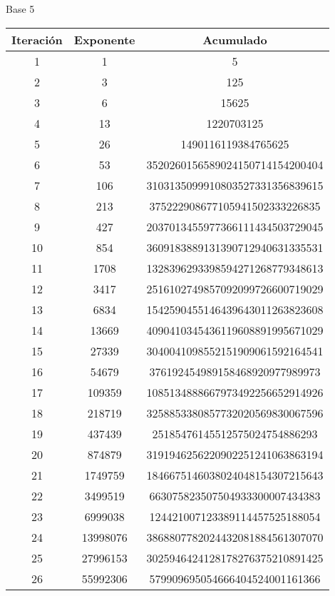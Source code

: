 \documentclass[fleqn]{article}
\begin{document}
\begin{center}
        \newpage Base 5
        \begin{tabular}{c | c | c}
            Iteración & Exponente & Acumulado \\ \hline
            1 & 1 & 5 \\
            2 & 3 & 125 \\
            3 & 6 & 15625 \\
            4 & 13 & 1220703125 \\
            5 & 26 & 1490116119384765625 \\
            6 & 53 & 3520260156589024150714154200404 \\
            7 & 106 & 3103135099910803527331356839615 \\
            8 & 213 & 375222908677105941502333226835 \\
            9 & 427 & 2037013455977366111434503729045 \\
            10 & 854 & 3609183889131390712940631335531 \\
            11 & 1708 & 1328396293398594271268779348613 \\
            12 & 3417 & 2516102749857092099726600719029 \\
            13 & 6834 & 1542590455146439643011263823608 \\
            14 & 13669 & 4090410345436119608891995671029 \\
            15 & 27339 & 3040041098552151909061592164541 \\
            16 & 54679 & 376192454989158468920977989973 \\
            17 & 109359 & 1085134888667973492256652914926 \\
            18 & 218719 & 3258853380857732020569830067596 \\
            19 & 437439 & 25185476145512575024754886293 \\
            20 & 874879 & 3191946256220902251241063863194 \\
            21 & 1749759 & 1846675146038024048154307215643 \\
            22 & 3499519 & 663075823507504933300007434383 \\
            23 & 6999038 & 124421007123389114457525188054 \\
            24 & 13998076 & 3868807782024432081884561307070 \\
            25 & 27996153 & 3025946424128178276375210891425 \\
            26 & 55992306 & 579909695054666404524001161366 \\

\end{tabular}
\end{center}
\end{document}
